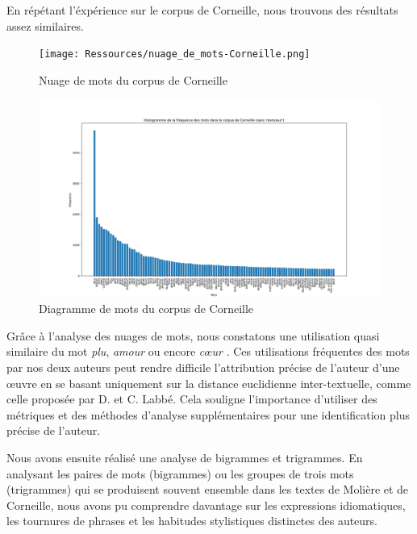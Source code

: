   \vspace{\baselineskip}

\hspace{0,5cm}En répétant l'éxpérience sur le corpus de Corneille, nous trouvons
des résultats assez similaires.

\begin{figure}[htbp]
  \centering
  \texttt{[image: Ressources/nuage\_de\_mots-Corneille.png]}
  \caption{Nuage de mots du corpus de Corneille}
  \label{fig:images}
\end{figure}

\begin{figure}[htbp]
  \centering
  \includegraphics[width=18cm]{Ressources/corneille_digramme.png}
  \caption{Diagramme de mots du corpus de Corneille}
  \label{fig:images}
\end{figure}

\newpage

Grâce à l'analyse des nuages de mots, nous constatons une utilisation
quasi similaire du mot \textit{plu}, \textit{amour} ou encore \textit{cœur} .
Ces utilisations fréquentes des mots par nos deux auteurs peut rendre difficile
l'attribution précise de l'auteur d'une œuvre en se basant uniquement sur la
distance euclidienne inter-textuelle, comme celle proposée par D. et C. Labbé.
Cela souligne l'importance d'utiliser des métriques et des méthodes d'analyse
supplémentaires pour une identification plus précise de l'auteur.

\vspace{\baselineskip}

Nous avons ensuite réalisé une analyse de bigrammes et trigrammes. En analysant
les paires de mots (bigrammes) ou les groupes de trois mots (trigrammes) qui se
produisent souvent ensemble dans les textes de Molière et de Corneille, nous
avons pu comprendre davantage sur les expressions idiomatiques, les tournures de
phrases et les habitudes stylistiques distinctes des auteurs.

